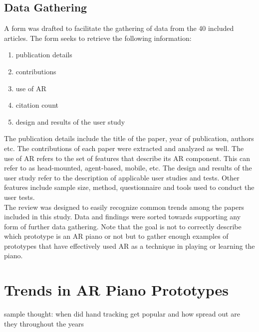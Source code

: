 \documentclass[manuscript,screen]{acmart}
\begin{document}
\subsection{Data Gathering}
A form was drafted to facilitate the gathering of data from the 40 included articles. The form seeks to retrieve the following information: 
\begin{enumerate}
    \item publication details
    \item contributions
    \item use of AR
    \item citation count
    \item design and results of the user study
\end{enumerate}
The publication details include the title of the paper, year of publication, authors etc. The contributions of each paper were extracted and analyzed as well. The use of AR refers to the set of features that describe its AR component. This can refer to as head-mounted, agent-based, mobile, etc. The design and results of the user study refer to the description of applicable user studies and tests. Other features include sample size, method, questionnaire and tools used to conduct the user tests. \\

The review was designed to easily recognize common trends among the papers included in this study. Data and findings were sorted towards supporting any form of further data gathering. Note that the goal is not to correctly describe which prototype is an AR piano or not but to gather enough examples of prototypes that have effectively used AR as a technique in playing or learning the piano.  
\section{Trends in AR Piano Prototypes}

sample thought: when did hand tracking get popular and how spread out are they throughout the years 
\end{document}
